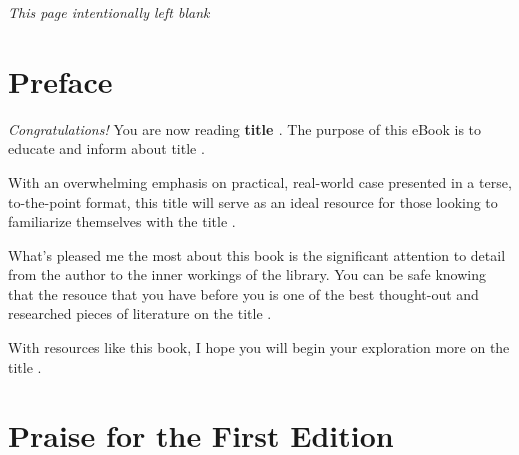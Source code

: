 \documentclass{article}
\begin{document}
\clearpage

\noindent
\begin{center}
{\normalsize \emph{This page intentionally left blank}}
\end{center}

\clearpage

\section*{Preface}
{\normalsize
\begin{flushleft}
\emph{Congratulations!} You are now reading \textbf{ {{ title }} }. The
purpose of this eBook is to educate and inform about {{ title }}.
\end{flushleft}

\begin{flushleft}
With an overwhelming emphasis on practical, real-world case presented
in a terse, to-the-point format, this {{ title }} will serve as an
ideal resource for those looking to familiarize themselves with the 
{{ title }}.
\end{flushleft}

\begin{flushleft}
What's pleased me the most about this book is the significant
attention to detail from the author to the inner workings of the
library. You can be safe knowing that the resouce that you have before
you is one of the best thought-out and researched pieces of literature
on the {{ title }}.
\end{flushleft}

\begin{flushleft}
With resources like this book, I hope you will begin your exploration
more on the {{ title }}.
\end{flushleft}
}

\clearpage

\section*{Praise for the First Edition}
\end{document}
